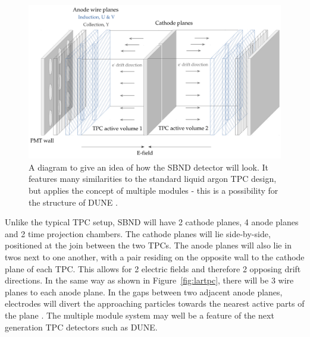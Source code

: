     \begin{figure}[h!]
        \center
        \includegraphics[width=.85\textwidth]{images/SBND_TPC.pdf}
        \caption{A diagram to give an idea of how the SBND detector will look. It features many similarities to the standard liquid argon TPC design, but applies the concept of multiple modules - this is a possibility for the structure of DUNE \cite{sbn}.}
        \label{fig:sbndtpc}
    \end{figure}
   
    \newpage 

    Unlike the typical TPC setup, SBND will have 2 cathode planes, 4 anode planes and 2 time projection chambers. The cathode planes will lie side-by-side, positioned at the join between the two TPCs. The anode planes will also lie in twos next to one another, with a pair residing on the opposite wall to the cathode plane of each TPC. This allows for 2 electric fields and therefore 2 opposing drift directions. In the same way as shown in Figure~\ref{fig:lartpc}, there will be 3 wire planes to each anode plane. In the gaps between two adjacent anode planes, electrodes will divert the approaching particles towards the nearest active parts of the plane \cite{sbn}. The multiple module system may well be a feature of the next generation TPC detectors such as DUNE. 

\clearpage
